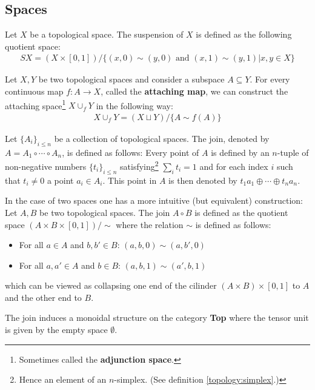 	
\subsection{Spaces}

	\begin{construct}[Suspension]
		Let $X$ be a topological space. The suspension of $X$ is defined as the following quotient space:
		\begin{gather}
			\label{topology:suspension}
			SX = 	(X\times [0, 1])/\{(x, 0) \sim (y, 0)\text{ and }(x, 1) \sim (y, 1)|x, y\in X\}
		\end{gather}
	\end{construct}
	
	\begin{construct}\label{topology:attaching_space}
		Let $X, Y$ be two topological spaces and consider a subspace $A\subseteq Y$. For every continuous map $f:A\rightarrow X$, called the \textbf{attaching map}, we can construct the attaching space\footnote{Sometimes called the \textbf{adjunction space}.} $X\cup_f Y$ in the following way:
		\begin{gather}
			X\cup_f Y = (X\sqcup Y)/\{A\sim f(A)\}
		\end{gather}
	\end{construct}
	
	\begin{construct}[Join]
		Let $\{A_i\}_{i\leq n}$ be a collection of topological spaces. The join, denoted by $A=A_1\circ\cdots\circ A_n$, is defined as follows: Every point of $A$ is defined by an $n$-tuple of non-negative numbers $\{t_i\}_{i\leq n}$ satisfying\footnote{Hence an element of an $n$-simplex. (See definition \ref{topology:simplex}.)} $\sum_it_i=1$ and for each index $i$ such that $t_i\neq 0$ a point $a_i\in A_i$. This point in $A$ is then denoted by $t_1a_1\oplus\cdots\oplus t_na_n$.
		
		In the case of two spaces one has a more intuitive (but equivalent) construction: Let $A, B$ be two topological spaces. The join $A\circ B$ is defined as the quotient space $(A\times B\times [0, 1])/\sim$ where the relation $\sim$ is defined as follows:
		\begin{itemize}
			\item For all $a\in A$ and $b, b'\in B$: $(a, b, 0)\sim(a, b', 0)$
			\item For all $a, a'\in A$ and $b\in B$: $(a, b, 1)\sim(a', b, 1)$
		\end{itemize}
		which can be viewed as collapsing one end of the cilinder $(A\times B)\times[0, 1]$ to $A$ and the other end to $B$.
	\end{construct}
	\begin{property}
		The join induces a monoidal structure on the category \textbf{Top} where the tensor unit is given by the empty space $\emptyset$.
	\end{property}
	
